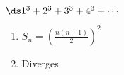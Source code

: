 {$\ds 1^3+2^3+3^3+4^3+\cdots$
}
{\begin{enumerate}
\item	$S_n = \left(\frac{n(n+1)}{2}\right)^2$
\item	Diverges
\end{enumerate}
}
